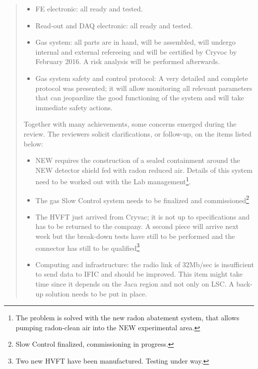 \begin{quotation}
\begin{itemize}
\begin{itemize}
\item Energy Plane (EP): is completed and was successfully tested up to 15 bar!   Only one out of the 12 PMT broke and will be investigated in the incoming future\footnote{PMT replaced, energy plane fully operational.}.
\item Commissioning of the detector by March 2016 and initial results by the end of the year \footnote{The commissioning of the detector started in March, as schedule and initial results are expected by May, 2016.}
\item Tracking plane (TP):  all 33 Dice Boards are tested and ready to go with all the necessary services (just 1 SiPM out of 2000 failed). Noticeable that all feed-through were tested and are qualified\footnote{Tracking plane already installed in detector.}
\end{itemize}
\item FE electronic: all ready and tested.
\item Read-out and DAQ electronic: all ready and tested.
\item Gas system: all parts are in hand, will be assembled, will undergo internal and external refereeing and will be certified by Cryvoc by February 2016. A risk analysis will be performed afterwards.
\item  Gas system safety and control protocol: A very detailed and complete  protocol was presented; it will  allow monitoring  all relevant parameters  that can jeopardize the good functioning of the system and will take immediate safety  actions.
\end{itemize}


Together with many achievements, some concerns emerged during the review. The reviewers solicit clarifications, or follow-up, on the items listed below:
\begin{itemize}
\item NEW requires the construction of a sealed containment around the NEW detector shield fed with radon reduced air. Details of this system need to be worked out with the Lab management\footnote{The problem is solved with the new radon abatement system, that allows pumping radon-clean air into the NEW experimental area.}.
\item The gas Slow Control system needs to be finalized and commissioned\footnote{Slow Control finalized, commissioning in progress. }
\item The HVFT just arrived from Cryvac; it is not up to specifications and has to be returned to the company. A second piece will arrive next week but the break-down tests have still to be performed and the connector has still to be qualified\footnote{Two new HVFT have been manufactured. Testing under way. }
\item Computing and infrastructure: the radio link of 32Mb/sec is insufficient to send data to IFIC and should be improved. This item might take time since it depends on the Jaca region and not only on LSC. A back-up solution needs to be put in place.
\end{itemize}


\end{quotation}
